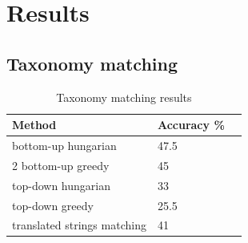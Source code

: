 \documentclass[11pt,a4paper]{article}
\begin{document}
\section{Results}

\subsection{Taxonomy matching}

	\begin{table}[!htbp]
	\small
	\caption{Taxonomy matching results}
	\label{table-taxonomies-results}		
	\centering
	\begin{tabular}{|l|l|l|}
	\hline
	{Method} & {Accuracy \%} \\ \hline
	bottom-up hungarian & 47.5 \\ \hline2
	bottom-up greedy & 45 \\ \hline
	top-down hungarian & 33 \\ \hline
	top-down greedy & 25.5 \\ \hline
	translated strings matching & 41 \\
	\hline
	\end{tabular}

\end{table}
\end{document}
